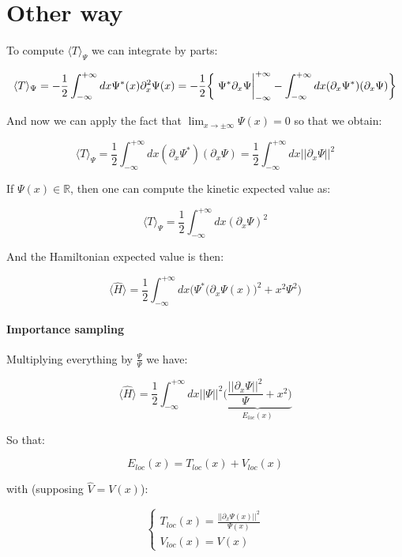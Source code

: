 \documentclass{book}
\begin{document}
\section{Other way}

To compute $\langle T\rangle_\Psi$ we can integrate by parts:

\[\langle T\rangle_\Psi=-\frac{1}{2}\int^{+\infty}_{-\infty} dx \Psi^*(x)\partial_x^2\Psi(x) =-\frac{1}{2}\bigg\{ \eval{\Psi^*\partial_x \Psi}_{-\infty}^{+\infty}-\int_{-\infty}^{+\infty}dx(\partial_x\Psi^*)(\partial_x\Psi)\bigg\}\]

And now we can apply the fact that $\displaystyle\lim_{x\to\pm\infty}\Psi(x)=0$ so that we obtain:

\[\langle T\rangle_\Psi=\frac{1}{2}\int_{-\infty}^{+\infty}dx(\partial_x\Psi^*)(\partial_x\Psi) = \frac{1}{2}\int_{-\infty}^{+\infty}dx||\partial_x\Psi||^2\]


If $\Psi(x)\in\mathbb{R}$, then one can compute the kinetic expected value as:

\[\langle T\rangle_\Psi=\frac{1}{2}\int_{-\infty}^{+\infty}dx(\partial_x\Psi)^2\]

And the Hamiltonian expected value is then:

\[\langle\hat{H}\rangle=\frac{1}{2}\int_{-\infty}^{+\infty}dx\bigg(  \Psi ^*\big(\partial_x\Psi(x)\big)^2+x^2\Psi^2\bigg)\]

\paragraph{Importance sampling} Multiplying everything by $\frac{\Psi}{\Psi}$ we have:

\[\langle\hat{H}\rangle=\frac{1}{2}\int_{-\infty}^{+\infty}dx||\Psi||^2\underbrace{\bigg(\frac{||\partial_x\Psi||^2}{\Psi}+x^2\bigg)}_{E_{loc}(x)}\]

So that:

\[E_{loc}(x) = T_{loc}(x)+V_{loc}(x)\]

with (supposing $\hat{V}=V(x)$):

\[\begin{cases}
    T_{loc}(x) = \frac{||\partial_x\Psi(x)||^2}{\Psi(x)}\\
    V_{loc}(x) = V(x)
\end{cases}\]
\end{document}
